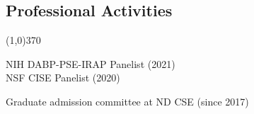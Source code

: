 \documentclass[10pt]{article}
\newenvironment{myindentpar}[1]%
{\begin{list}{}%
         {\setlength{\leftmargin}{#1}}%
         \item[]%
}
{\end{list}}
\newcounter{list}
\begin{document}
\subsection{\sc Professional Activities}
\vspace{-0.4cm} \line(1,0){370} \vspace{-0.1cm}

\begin{myindentpar}{0.75cm}

\hspace{-0.75cm}{\bf Governmental Service}

{\small

\textcolor{white}{} NIH DABP-PSE-IRAP Panelist (2021) \\
\textcolor{white}{} NSF CISE Panelist (2020)
}

\hspace{-0.75cm}{\bf Departmental Service}

{\small

\textcolor{white}{} Graduate admission committee at ND CSE (since 2017)
}

\hspace{-0.75cm}{\bf Ph.D. Thesis Committee}

{\small

}
\end{myindentpar}
\end{document}
